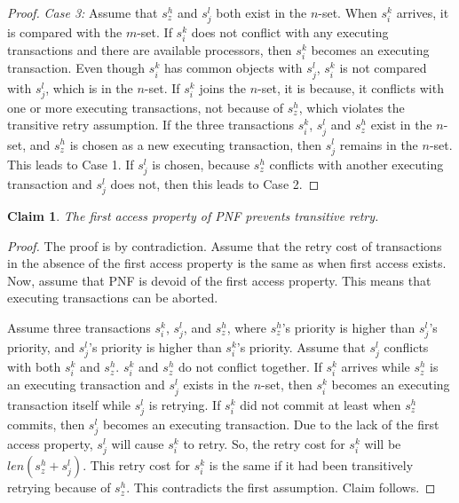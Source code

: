 \documentclass[12pt,english]{report}
\newtheorem{clm}{Claim}
\newtheorem{proof}{Proof}
\begin{document}
\begin{proof}
\textit{Case 3:} Assume that $s_{z}^{h}$ and $s_{j}^{l}$ both exist in the $n$-set.
When $s_{i}^{k}$ arrives, it is compared with the $m$-set. If $s_{i}^{k}$ does not conflict with any executing transactions and there are available processors, then $s_{i}^{k}$ becomes an executing transaction. 
Even though $s_{i}^{k}$ has common objects with $s_{j}^{l}$, $s_{i}^{k}$ is not compared with $s_{j}^{l}$, which is in the $n$-set. If $s_{i}^{k}$ joins the $n$-set, it is because, it conflicts with one or more executing transactions, not because of $s_{z}^{h}$, which violates the transitive retry assumption.
If the three transactions $s_i^k$, $s_j^l$ and $s_z^h$ exist in the $n$-set, and  $s_{z}^{h}$ is chosen as a new executing transaction, then $s_{j}^{l}$ remains in the $n$-set. This leads to
Case 1. If $s_{j}^{l}$ is chosen, because $s_{z}^{h}$ conflicts
with another executing transaction and $s_{j}^{l}$ does not, then
this leads to Case 2. 
%
\end{proof}


\begin{clm}\label{first-access}
The first access property of PNF prevents transitive retry.
\end{clm}
\begin{proof}\normalfont
The proof is by contradiction. Assume that the retry cost of transactions
in the absence of the first access property is the same as when first access  exists. Now, assume that PNF is devoid of the first access property.  This means that executing transactions can be aborted. 

Assume three transactions $s_{i}^{k}$, $s_{j}^{l}$, and $s_{z}^{h}$, where $s_{z}^{h}$'s priority is higher than $s_{j}^{l}$'s priority, and $s_j^l$'s priority is higher than $s_{i}^{k}$'s priority. Assume that $s_{j}^{l}$ conflicts with both $s_{i}^{k}$ and $s_{z}^{h}$. 
$s_{i}^{k}$ and $s_{z}^{h}$ do not conflict together. If $s_{i}^{k}$
arrives while $s_{z}^{h}$ is an executing transaction and $s_{j}^{l}$
exists in the $n$-set, then $s_{i}^{k}$ becomes an executing transaction itself while $s_{j}^{l}$ is retrying. If $s_{i}^{k}$ did not commit at least when $s_{z}^{h}$ commits, then $s_{j}^{l}$ becomes an executing transaction. 
Due to the lack of the first access property, $s_{j}^{l}$ will cause $s_{i}^{k}$ to retry. So, the retry cost for $s_{i}^{k}$ will be $len(s_{z}^{h}+s_{j}^{l})$. This
retry cost for $s_{i}^{k}$ is the same if it had been transitively
retrying because of $s_{z}^{h}$. 
This contradicts the first
assumption. Claim follows.
\end{proof}
\end{document}
